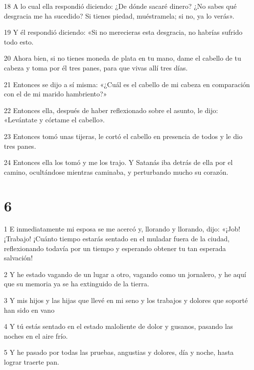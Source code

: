\par 18 A lo cual ella respondió diciendo: ¿De dónde sacaré dinero? ¿No sabes qué desgracia me ha sucedido? Si tienes piedad, muéstramela; si no, ya lo verás».

\par 19 Y él respondió diciendo: «Si no merecieras esta desgracia, no habrías sufrido todo esto.

\par 20 Ahora bien, si no tienes moneda de plata en tu mano, dame el cabello de tu cabeza y toma por él tres panes, para que vivas allí tres días.

\par 21 Entonces se dijo a sí misma: «¿Cuál es el cabello de mi cabeza en comparación con el de mi marido hambriento?»

\par 22 Entonces ella, después de haber reflexionado sobre el asunto, le dijo: «Levántate y córtame el cabello».

\par 23 Entonces tomó unas tijeras, le cortó el cabello en presencia de todos y le dio tres panes.

\par 24 Entonces ella los tomó y me los trajo. Y Satanás iba detrás de ella por el camino, ocultándose mientras caminaba, y perturbando mucho su corazón.

\chapter{6}

\par 1 E inmediatamente mi esposa se me acercó y, llorando y llorando, dijo: «¡Job! ¡Trabajo! ¡Cuánto tiempo estarás sentado en el muladar fuera de la ciudad, reflexionando todavía por un tiempo y esperando obtener tu tan esperada salvación!

\par 2 Y he estado vagando de un lugar a otro, vagando como un jornalero, y he aquí que su memoria ya se ha extinguido de la tierra.

\par 3 Y mis hijos y las hijas que llevé en mi seno y los trabajos y dolores que soporté han sido en vano

\par 4 Y tú estás sentado en el estado maloliente de dolor y gusanos, pasando las noches en el aire frío.

\par 5 Y he pasado por todas las pruebas, angustias y dolores, día y noche, hasta lograr traerte pan.

